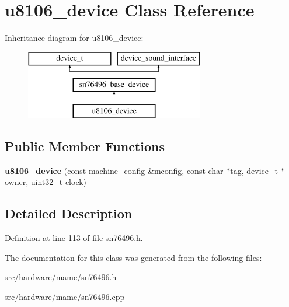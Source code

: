 \hypertarget{classu8106__device}{\section{u8106\-\_\-device Class Reference}
\label{classu8106__device}
}
Inheritance diagram for u8106\-\_\-device\-:\begin{figure}[H]
\begin{center}
\leavevmode
\includegraphics[height=3.000000cm]{classu8106__device}
\end{center}
\end{figure}
\subsection*{Public Member Functions}
\begin{DoxyCompactItemize}
\item 
\hypertarget{classu8106__device_a27e308267bd1877a226a24ecc479d08f}{{\bfseries u8106\-\_\-device} (const \hyperlink{structmachine__config}{machine\-\_\-config} \&mconfig, const char $\ast$tag, \hyperlink{classdevice__t}{device\-\_\-t} $\ast$owner, uint32\-\_\-t clock)}\label{classu8106__device_a27e308267bd1877a226a24ecc479d08f}

\end{DoxyCompactItemize}


\subsection{Detailed Description}


Definition at line 113 of file sn76496.\-h.



The documentation for this class was generated from the following files\-:\begin{DoxyCompactItemize}
\item 
src/hardware/mame/sn76496.\-h\item 
src/hardware/mame/sn76496.\-cpp\end{DoxyCompactItemize}

